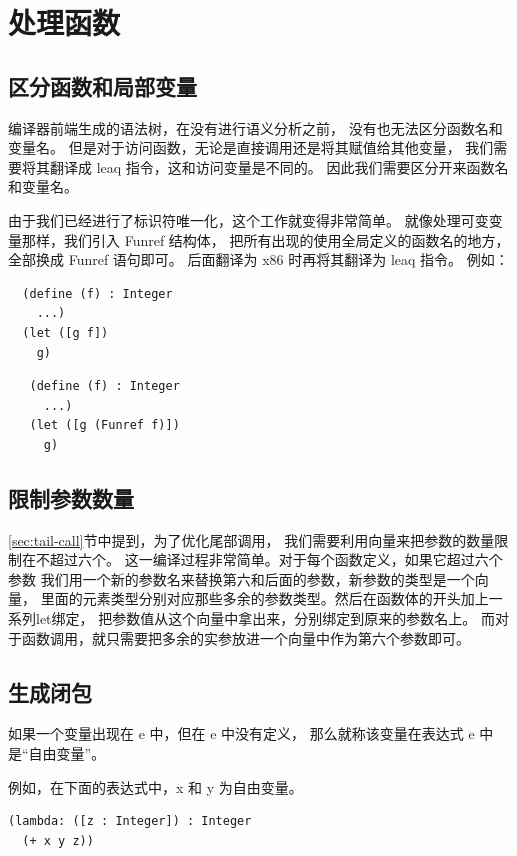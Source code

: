
\section{处理函数}

\subsection{区分函数和局部变量}

编译器前端生成的语法树，在没有进行语义分析之前，
没有也无法区分函数名和变量名。
但是对于访问函数，无论是直接调用还是将其赋值给其他变量，
我们需要将其翻译成 leaq 指令，这和访问变量是不同的。
因此我们需要区分开来函数名和变量名。

由于我们已经进行了标识符唯一化，这个工作就变得非常简单。
就像处理可变变量那样，我们引入 Funref 结构体，
把所有出现的使用全局定义的函数名的地方，全部换成 Funref 语句即可。
后面翻译为 x86 时再将其翻译为 leaq 指令。
例如：

\begin{transformation}
\begin{lstlisting}
  (define (f) : Integer
    ...)
  (let ([g f])
    g)
\end{lstlisting}
\compilesto
\begin{lstlisting}
   (define (f) : Integer
     ...)
   (let ([g (Funref f)])
     g)
\end{lstlisting}
\end{transformation}


\subsection{限制参数数量}
\ref{sec:tail-call}节中提到，为了优化尾部调用，
我们需要利用向量来把参数的数量限制在不超过六个。
这一编译过程非常简单。对于每个函数定义，如果它超过六个参数
我们用一个新的参数名来替换第六和后面的参数，新参数的类型是一个向量，
里面的元素类型分别对应那些多余的参数类型。然后在函数体的开头加上一系列let绑定，
把参数值从这个向量中拿出来，分别绑定到原来的参数名上。
而对于函数调用，就只需要把多余的实参放进一个向量中作为第六个参数即可。


\subsection{生成闭包}

如果一个变量出现在 e 中，但在 e 中没有定义，
那么就称该变量在表达式 e 中是“自由变量”。

例如，在下面的表达式中，x 和 y 为自由变量。
\begin{multilinecode}
\begin{lstlisting}
(lambda: ([z : Integer]) : Integer
  (+ x y z))
\end{lstlisting}
\end{multilinecode}

